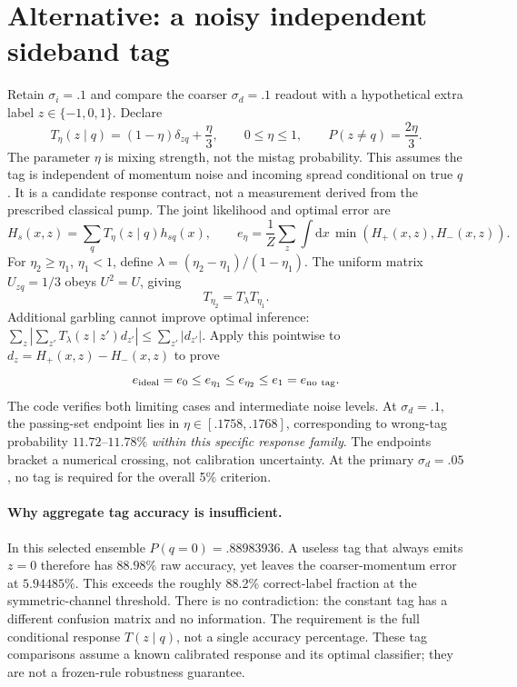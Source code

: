 \documentclass[11pt,a4paper]{article}
\newcommand{\dd}{\mathrm d}
\begin{document}
\section{Alternative: a noisy independent sideband tag}
Retain $\sigma_i=.1$ and compare the coarser $\sigma_d=.1$ readout
with a hypothetical extra label $z\in\{-1,0,1\}$. Declare
\begin{equation}
 T_\eta(z\mid q)=(1-\eta)\delta_{zq}+\frac{\eta}{3},\qquad
 0\leq\eta\leq1,\qquad P(z\ne q)=\frac{2\eta}{3}.
\end{equation}
The parameter $\eta$ is mixing strength, not the mistag probability.
This assumes the tag is independent of momentum noise and incoming
spread conditional on true $q$. It is a candidate response contract,
not a measurement derived from the prescribed classical pump.
The joint likelihood and optimal error are
\begin{equation}
 H_s(x,z)=\sum_qT_\eta(z\mid q)h_{sq}(x),\qquad
 e_\eta=\frac1Z\sum_z\int\dd x\,\min(H_+(x,z),H_-(x,z)).
\end{equation}
For $\eta_2\geq\eta_1$, $\eta_1<1$, define
$\lambda=(\eta_2-\eta_1)/(1-\eta_1)$. The uniform matrix
$U_{zq}=1/3$ obeys $U^2=U$, giving
\begin{equation}
 T_{\eta_2}=T_\lambda T_{\eta_1}.
\end{equation}
Additional garbling cannot improve optimal inference:
$\sum_z|\sum_{z'}T_\lambda(z\mid z')d_{z'}|
\leq\sum_{z'}|d_{z'}|$. Apply this pointwise to
$d_z=H_+(x,z)-H_-(x,z)$ to prove
\begin{equation}
e_{\rm ideal}=e_0\leq e_{\eta_1}\leq e_{\eta_2}
\leq e_1=e_{\rm no\ tag}.
\end{equation}
The code verifies both limiting cases and intermediate noise levels.
At $\sigma_d=.1$, the passing-set endpoint lies in
$\eta\in[.1758,.1768]$, corresponding to wrong-tag probability
$11.72$--$11.78\%$ \emph{within this specific response family}.
The endpoints bracket a numerical crossing, not calibration uncertainty.
At the primary $\sigma_d=.05$, no tag is required for the overall
5\% criterion.

\paragraph{Why aggregate tag accuracy is insufficient.}
In this selected ensemble $P(q=0)=.88983936$. A useless tag that
always emits $z=0$ therefore has $88.98\%$ raw accuracy, yet leaves
the coarser-momentum error at $5.94485\%$. This exceeds the roughly
88.2\% correct-label fraction at the symmetric-channel threshold.
There is no contradiction: the constant tag has a different
confusion matrix and no information. The requirement is the full
conditional response $T(z\mid q)$, not a single accuracy percentage.
These tag comparisons assume a known calibrated response and its
optimal classifier; they are not a frozen-rule robustness guarantee.
\end{document}
